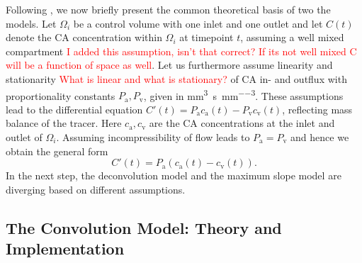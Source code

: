 \documentclass[paper=a4, fontsize=11pt,parskip=half,headings=small]{scrartcl}
\newcommand{\ca}{c_\mathrm{a}}
\newcommand{\cout}{c_{\mathrm{v}}}
\newcommand{\Pa}{P_{\mathrm{a}}}
\newcommand{\Pout}{P_{\mathrm{v}}}
\newcommand{\siP}{\milli\meter\cubed\per\second\per\milli\meter\cubed}
\begin{document}
		
	Following \cite{sourbron13}, we now briefly present the common theoretical basis of two the models.
	Let $\Omega_i$ be a control volume with one inlet and one outlet and let $C(t)$ denote the CA concentration within $\Omega_i$ at timepoint $t$, assuming a well mixed compartment \textcolor{red}{I added this assumption, isn't that correct? If its not well mixed C will be a function of space as well}. 
	Let us furthermore assume linearity and stationarity \textcolor{red}{What is linear and what is stationary?} of CA in- and outflux with proportionality constants $\Pa, \Pout$, given in \si{\siP}.
	These assumptions lead to the differential equation $C'(t) = \Pa\ca(t) - \Pout\cout(t)$, reflecting mass balance of the tracer. 
	Here $\ca,\cout$ are the CA concentrations at the inlet and outlet of $\Omega_i$.
	Assuming incompressibility of flow leads to $\Pa = \Pout$ and hence we obtain the general form
	\begin{equation}
		C'(t) = \Pa\left(\ca(t) - \cout(t)\right).
		\label{eq:classicgeneral}
	\end{equation}
	In the next step, the deconvolution model and the maximum slope model are diverging based on different assumptions.

	\subsection{The Convolution Model: Theory and Implementation}\label{sec:conv}
	
\end{document}

